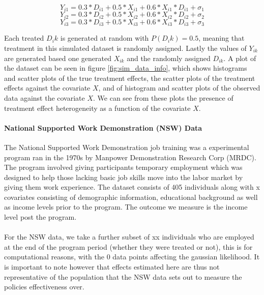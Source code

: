 \documentclass{article}
\begin{document}
\begin{equation}
\label{eqn:latent_reg1}
Y_{i1} = 0.3 * D_{i1} + 0.5*X_{i1} + 0.6*X_{i1}*D_{i1} + \sigma_1
\end{equation}
\begin{equation}
\label{eqn:latent_reg1}
Y_{i2} = 0.3 * D_{i2} + 0.5*X_{i2} + 0.6*X_{i2}*D_{i2} + \sigma_2
\end{equation}
\begin{equation}
\label{eqn:latent_reg1}
Y_{i3} = 0.3 * D_{i3} + 0.5*X_{i3} + 0.6*X_{i3}*D_{i3} + \sigma_3
\end{equation}

Each treated $D_ik$ is generated at random with $P(D_ik) = 0.5$, meaning that treatment in this simulated dataset is randomly assigned. Lastly the values of $Y_{ik}$ are generated based one generated $X_{ik}$ and the randomly assigned $D_{ik}$. A plot of the dataset can be seen in figure \ref{fig:sim_data_info}, which shows histograms and scatter plots of the true treatment effects, the scatter plots of the treatment effects against the covariate $X$, and of histogram and scatter plots of the observed data against the covariate $X$. We can see from these plots the presence of treatment effect heterogeneity as a function of the covariate $X$. 

\paragraph{National Supported Work Demonstration (NSW) Data} The National Supported Work Demonstration job training was a experimental program ran in the 1970s by Manpower Demonstration Research Corp (MRDC). The program involved giving participants temporary employment which was designed to help those lacking basic job skills move into the labor market by giving them work experience. The dataset consists of 405 individuals along with x covariates consisting of demographic information, educational background as well as income levels prior to the program. The outcome we measure is the income level post the program. 
\\ \\ 
For the NSW data, we take a further subset of xx individuals who are employed at the end of the program period (whether they were treated or not), this is for computational reasons, with the 0 data points affecting the gaussian likelihood. It is important to note however that effects estimated here are thus not representative of the population that the NSW data sets out to measure the policies effectiveness over.
\end{document}
